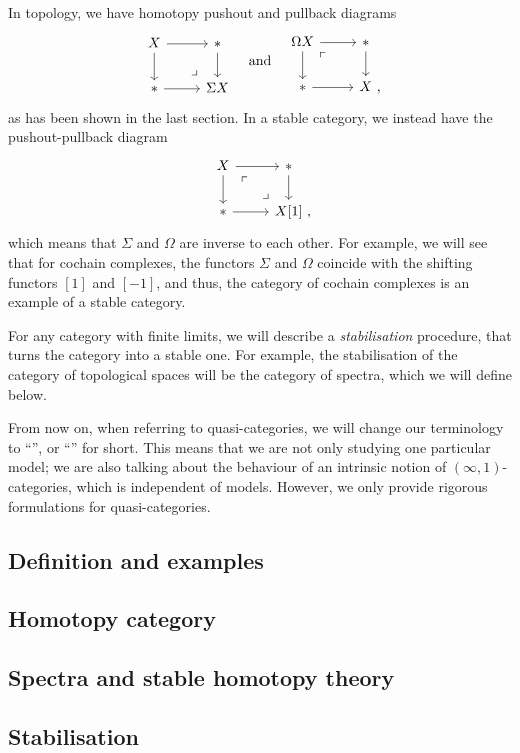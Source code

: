 In topology, we have homotopy pushout and pullback diagrams
\[ \begin{tikzcd}
    X\ar[r]\ar[d]\ar[dr,phantom,pos=.8,"\lrcorner"] & *\ar[d] \\
    *\ar[r] & \Sigma X
\end{tikzcd}
\quad\text{and}\quad
\begin{tikzcd}
    \Omega X\ar[r]\ar[d]\ar[dr,phantom,pos=.2,"\ulcorner"] & *\ar[d] \\
    *\ar[r] & X\rlap{\ ,}
\end{tikzcd} \]
as has been shown in the last section.
In a stable category, we instead have the pushout-pullback diagram
\[ \begin{tikzcd}
    X\ar[r]\ar[d]\ar[dr,phantom,start anchor=south east,"\ulcorner" pos=.25,"\lrcorner" pos=.85] & *\ar[d] \\
    *\ar[r] & X[1]\rlap{\ ,}
\end{tikzcd} \]
which means that $\Sigma$ and $\Omega$ are inverse to each other.
For example, we will see that for cochain complexes,
the functors $\Sigma$ and $\Omega$ coincide with the shifting functors
$[1]$ and $[-1]$, and thus, the category of cochain complexes
is an example of a stable category.

For any category with finite limits, we will describe a \emph{stabilisation}
procedure, that turns the category into a stable one.
For example, the stabilisation of the category of topological spaces
will be the category of spectra, which we will define below.

From now on, when referring to quasi-categories,
we will change our terminology to ``'',
or ``'' for short.
This means that we are not only studying one particular model;
we are also talking about the behaviour of an intrinsic notion of $(\infty,1)$-categories,
which is independent of models.
However, we only provide rigorous formulations for quasi-categories.

\subsection{Definition and examples}

\nyw

\subsection{Homotopy category}

\nyw

\subsection{Spectra and stable homotopy theory}

\nyw

\subsection{Stabilisation}

\nyw

